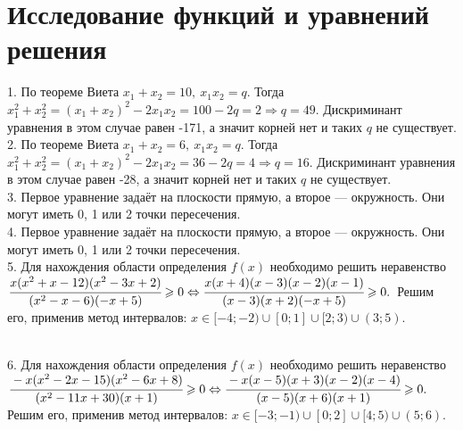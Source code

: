 \documentclass[12pt]{article}
\begin{document}
\section{Исследование функций и уравнений решения}
1. По теореме Виета $x_1+x_2=10,\ x_1x_2=q.$ Тогда $x_1^2+x_2^2=(x_1+x_2)^2-2x_1x_2=100-2q=2\Rightarrow q=49.$ Дискриминант уравнения в этом случае равен -171, а значит корней нет и таких $q$ не существует.\\
2. По теореме Виета $x_1+x_2=6,\ x_1x_2=q.$ Тогда $x_1^2+x_2^2=(x_1+x_2)^2-2x_1x_2=36-2q=4\Rightarrow q=16.$ Дискриминант уравнения в этом случае равен -28, а значит корней нет и таких $q$ не существует.\\
3. Первое уравнение задаёт на плоскости прямую, а второе --- окружность. Они могут иметь 0, 1 или 2 точки пересечения.\\
4. Первое уравнение задаёт на плоскости прямую, а второе --- окружность. Они могут иметь 0, 1 или 2 точки пересечения.\\
5. Для нахождения области определения $f(x)$ необходимо решить неравенство\\ $\cfrac{x(x^2+x-12)(x^2-3x+2)}{(x^2-x-6)(-x+5)}\geqslant0
\Leftrightarrow \cfrac{x(x+4)(x-3)(x-2)(x-1)}{(x-3)(x+2)(-x+5)}\geqslant0.$ Решим его, применив метод интервалов:
$x\in[-4;-2)\cup[0;1]\cup[2;3)\cup(3;5).$
\begin{figure}[ht!]
\end{figure}\\
6. Для нахождения области определения $f(x)$ необходимо решить неравенство\\ $\cfrac{-x(x^2-2x-15)(x^2-6x+8)}{(x^2-11x+30)(x+1)}\geqslant0
\Leftrightarrow \cfrac{-x(x-5)(x+3)(x-2)(x-4)}{(x-5)(x+6)(x+1)}\geqslant0.$ Решим его, применив метод интервалов:
$x\in[-3;-1)\cup[0;2]\cup[4;5)\cup(5;6).$
\begin{figure}[ht!]
\end{figure}\\
\end{document}
